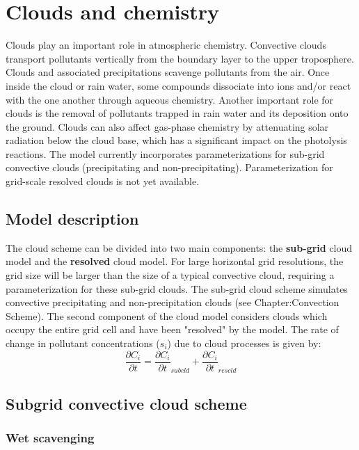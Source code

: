\chapter{Clouds and chemistry}
\minitoc
%
Clouds play an important role in atmospheric chemistry.
Convective clouds transport pollutants vertically from the boundary layer to 
the upper troposphere. Clouds and associated precipitations scavenge pollutants 
from the air. Once inside the cloud or rain water, some compounds 
dissociate into ions and/or react with the one another through aqueous 
chemistry.
Another important role for clouds is the removal of pollutants trapped in 
rain water and its deposition onto the ground. Clouds can also affect 
gas-phase chemistry by attenuating solar radiation below the cloud base,
which has a significant impact on the photolysis reactions. 
The model currently incorporates parameterizations for sub-grid convective 
clouds (precipitating and non-precipitating). Parameterization for grid-scale 
resolved clouds is not yet available. 
\section{Model description}
The cloud scheme can be divided into two main components: the 
{\bf sub-grid} cloud
model and the {\bf resolved} cloud model. 
For large horizontal grid resolutions, the grid size will be larger than the 
size of a typical convective cloud, requiring a parameterization for these
sub-grid clouds. The sub-grid cloud scheme simulates convective 
precipitating and non-precipitation clouds (see Chapter:Convection Scheme).
The second component of the cloud model considers clouds which occupy the 
entire grid cell and have been "resolved" by the model. The rate of change in 
pollutant concentrations ($s_i$) due to cloud processes is given by:
$$
\frac{\partial C_i}{\partial t} = \frac{\partial C_i}{\partial t}_{subcld} + \frac{\partial C_i}{\partial t}_{rescld}
$$
\section{Subgrid convective cloud scheme}
\subsection{Wet scavenging}

